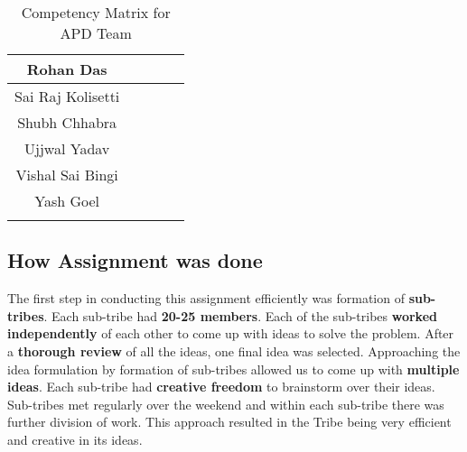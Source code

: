 \begin{center}
\begin{longtable}{|c|c|p{1.2cm}|c|c|}
Rohan Das         & \cellcolor[HTML]{92D050} & \cellcolor[HTML]{00B050} & \cellcolor[HTML]{FFC000} & \cellcolor[HTML]{F2F2F2} \\ \hline
Sai Raj Kolisetti & \cellcolor[HTML]{92D050} & \cellcolor[HTML]{92D050} & \cellcolor[HTML]{F2F2F2} & \cellcolor[HTML]{F2F2F2} \\ \hline
Shubh Chhabra     & \cellcolor[HTML]{FFFF00} & \cellcolor[HTML]{92D050} & \cellcolor[HTML]{F2F2F2} & \cellcolor[HTML]{F2F2F2} \\ \hline
Ujjwal Yadav      & \cellcolor[HTML]{92D050} & \cellcolor[HTML]{00B050} & \cellcolor[HTML]{F2F2F2} & \cellcolor[HTML]{F2F2F2} \\ \hline
Vishal Sai Bingi  & \cellcolor[HTML]{92D050} & \cellcolor[HTML]{92D050} & \cellcolor[HTML]{F2F2F2} & \cellcolor[HTML]{F2F2F2} \\ \hline
Yash Goel         & \cellcolor[HTML]{92D050} & \cellcolor[HTML]{92D050} & \cellcolor[HTML]{F2F2F2} & \cellcolor[HTML]{F2F2F2} \\ \hline
\caption{Competency Matrix for APD Team}
\end{longtable}
\end{center}





\newpage
\subsection{How Assignment was done}


The first step in conducting this assignment efficiently was formation of \textbf{sub-tribes}. Each sub-tribe had \textbf{20-25 members}. Each of the sub-tribes \textbf{worked independently} of each other to come up with ideas to solve the problem. After a \textbf{thorough review} of all the ideas, one final idea was selected. Approaching the idea formulation by formation of sub-tribes allowed us to come up with \textbf{multiple ideas}. Each sub-tribe had \textbf{creative freedom} to brainstorm over their ideas. Sub-tribes met regularly over the weekend and within each sub-tribe there was further division of work. This approach resulted in the Tribe being very efficient and creative in its ideas.
\\

